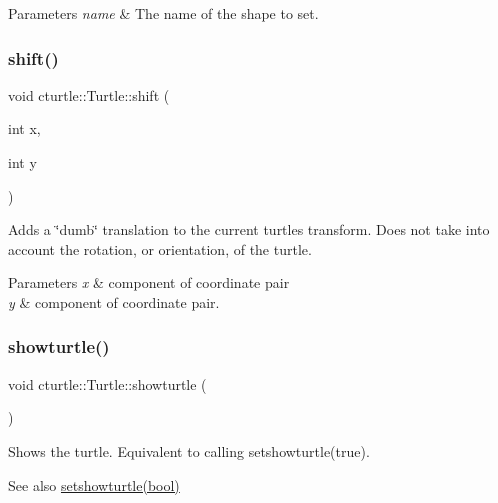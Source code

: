 \begin{DoxyParams}{Parameters}
{\em name} & The name of the shape to set. \\
\hline
\end{DoxyParams}
\mbox{\label{classcturtle_1_1Turtle_aea45fc1d0f00b82fc64a0f97dd6c1ea2}} 
\subsubsection{\texorpdfstring{shift()}{shift()}}
{\footnotesize\ttfamily void cturtle\+::\+Turtle\+::shift (\begin{DoxyParamCaption}\item[{int}]{x,  }\item[{int}]{y }\end{DoxyParamCaption})}

Adds a \char`\"{}dumb\char`\"{} translation to the current turtle\textquotesingle{}s transform. Does not take into account the rotation, or orientation, of the turtle. 
\begin{DoxyParams}{Parameters}
{\em x} & component of coordinate pair \\
\hline
{\em y} & component of coordinate pair. \\
\hline
\end{DoxyParams}
\mbox{\label{classcturtle_1_1Turtle_ac676ff53f6393c70d665053cab1d67c5}} 
\subsubsection{\texorpdfstring{showturtle()}{showturtle()}}
{\footnotesize\ttfamily void cturtle\+::\+Turtle\+::showturtle (\begin{DoxyParamCaption}{ }\end{DoxyParamCaption})\hspace{0.3cm}{\ttfamily [inline]}}



Shows the turtle. Equivalent to calling setshowturtle(true). 

\begin{DoxySeeAlso}{See also}
\hyperlink{classcturtle_1_1Turtle_a9e83fdd5c469e4863cf9b460e4d29130}{setshowturtle(bool)} 
\end{DoxySeeAlso}
\mbox{\label{classcturtle_1_1Turtle_a5f2010373aeb82207975e9f1b4168747}} 
